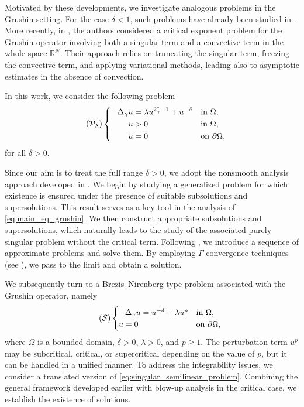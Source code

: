 \documentclass[11pt]{article}
\newcommand{\Gr}{\Delta_{\gamma}}
\begin{document}
Motivated by these developments, we investigate analogous problems in the Grushin setting. For the case $\delta < 1$, such problems have already been studied in \cite{sanjit_bal2024multiplicity}. More recently, in \cite{baldelli2025existence}, the authors considered a critical exponent problem for the Grushin operator involving both a singular term and a convective term in the whole space $\mathbb{R}^N$. Their approach relies on truncating the singular term, freezing the convective term, and applying variational methods, leading also to asymptotic estimates in the absence of convection.

In this work, we consider the following problem
\begin{equation}\label{eq:main_eq_grushin}\tag{$\mathcal{P}_{\lambda}$}
\begin{cases}
\begin{aligned}
    - \Delta_{\gamma} u &= \lambda  u^{2_\gamma^* - 1} + u^{-\delta}  && \text{in } \Omega,\\
    u &> 0 && \text{in } \Omega,\\
    u &= 0 && \text{on } \partial \Omega,
\end{aligned}
\end{cases}
\end{equation}
for all $\delta > 0$.

Since our aim is to treat the full range $\delta > 0$, we adopt the nonsmooth analysis approach developed in \cite{hirano_fully_singular}. We begin by studying a generalized problem for which existence is ensured under the presence of suitable subsolutions and supersolutions. This result serves as a key tool in the analysis of \eqref{eq:main_eq_grushin}. We then construct appropriate subsolutions and supersolutions, which naturally leads to the study of the associated purely singular problem without the critical term. Following \cite{canino_degiovanni_fully_singular}, we introduce a sequence of approximate problems and solve them. By employing $\Gamma$-convergence techniques (see \cite{dal_maso_gamma_convergence}), we pass to the limit and obtain a solution.

We subsequently turn to a Brezis--Nirenberg type problem associated with the Grushin operator, namely
\begin{equation}\label{eq:singular_semilinear_problem}\tag{$\mathcal{S}$}
\begin{cases}
-\Gr u = u^{-\delta} + \lambda u^{p} & \text{in } \Omega, \\
u = 0 & \text{on } \partial\Omega,
\end{cases}
\end{equation}
where $\Omega$ is a bounded domain, $\delta > 0$, $\lambda > 0$, and $p \geq 1$. The perturbation term $u^p$ may be subcritical, critical, or supercritical depending on the value of $p$, but it can be handled in a unified manner. To address the integrability issues, we consider a translated version of \eqref{eq:singular_semilinear_problem}. Combining the general framework developed earlier with blow-up analysis in the critical case, we establish the existence of solutions.
\end{document}
